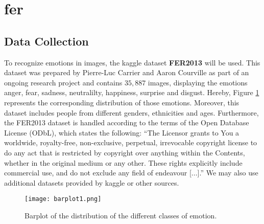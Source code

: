 \section{\acrlong{fer}}
\subsection{Data Collection}\label{subchap:DC}
To recognize emotions in images, the kaggle dataset \textbf{FER2013} \cite{FER2013} will be used. This dataset was prepared by Pierre-Luc Carrier and Aaron Courville as part of an ongoing research project and contains $35,887$ images, displaying the emotions anger, fear, sadness, neutralilty, happiness, surprise and disgust. Hereby, Figure \ref{fig:emo-distribution} represents the corresponding distribution of those emotions. Moreover, this dataset includes people from different genders, ethnicities and ages. Furthermore, the FER2013 dataset is handled according to the terms of the Open Database License (ODbL), which states the following: ``The Licensor grants to You a worldwide, royalty-free, non-exclusive, perpetual, irrevocable copyright license to do any act that is restricted by copyright over anything within the Contents, whether in the original medium or any other. These rights explicitly include commercial use, and do not exclude any field of endeavour [...].'' \cite{odbl} We may also use additional datasets provided by kaggle or other sources.

\begin{figure}[h!]
\centering
\texttt{[image: barplot1.png]}
\caption{Barplot of the distribution of the different classes of emotion.}\label{fig:emo-distribution}
\end{figure}

